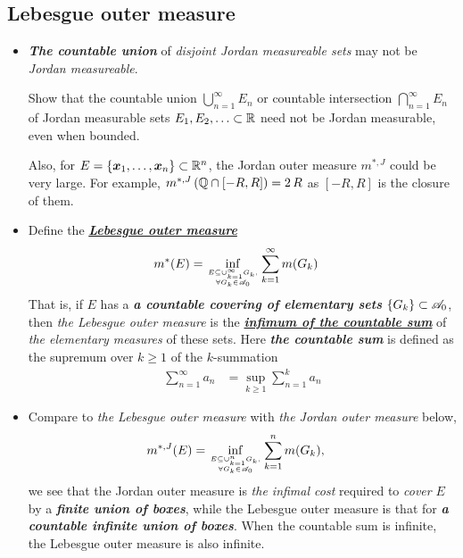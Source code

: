 \documentclass[11pt]{article}
\begin{document}
\subsection{Lebesgue outer measure}
\begin{itemize}
\item \begin{remark} 
\emph{\textbf{The countable union}} of \emph{disjoint Jordan measureable sets} may not be \emph{Jordan measureable}. 

\begin{exercise}
Show that the countable union $\bigcup_{n=1}^{\infty}E_n$ or countable intersection $\bigcap_{n=1}^{\infty}E_n$ of Jordan measurable sets $E_1, E_2, \ldots \subset {\mathbb R}$
need not be Jordan measurable, even when bounded.
\end{exercise}


Also, for $E = \left\{\boldsymbol{x}_{1}, \ldots, \boldsymbol{x}_{n}\right\} \subset {\mathbb R}^{n}$, the Jordan outer measure $m^{*, J}$ could be very large. For example, $m^{*, J}\left({\mathbb Q}\cap [-R, R]\right) = 2\,R$ as $[-R, R]$ is the closure of them. 
\end{remark} 
 
\item \begin{definition}
Define the \underline{\emph{\textbf{Lebesgue outer measure}}} \citep{tao2011introduction}
 \begin{align}
 m^{*}(E) &= \inf\limits_{E \subseteq \cup_{k=1}^{\infty}G_{k}, \atop {\forall G_{k}\in {\mathscr A}_{0}}}\sum_{k=1}^{\infty}m(G_{k})
 \label{eqn: L_outer_measure}
 \end{align} That is, if $E$ has a \emph{\textbf{a countable covering of elementary sets}} $\left\{G_k\right\} \subset {\mathscr A}_{0}$, then \emph{the Lebesgue outer measure} is the \underline{\emph{\textbf{infimum of the countable sum}}} of \emph{the elementary measures} of these sets. Here \emph{\textbf{the countable sum}} is defined as the supremum over $k\ge 1$ of the $k$-summation 
\begin{align*}
\sum_{n=1}^{\infty}a_{n} &= \sup_{k\ge 1}\sum_{n=1}^{k}a_{n}
\end{align*}
\end{definition}
 
\item \begin{remark} 
Compare to \emph{the Lebesgue outer measure} with \emph{the Jordan outer measure} below,
\begin{align*}
m^{*, J}(E) &=  \inf\limits_{E \subseteq \cup_{k=1}^{n}G_{k}, \atop {\forall G_{k}\in {\mathscr A}_{0}}}\sum_{k=1}^{n}m(G_{k}),
\end{align*} we see that the Jordan outer measure is \emph{the infimal cost} required to \emph{cover} $E$ by a \emph{\textbf{finite union of boxes}}, while the Lebesgue outer measure is that for \emph{\textbf{a countable infinite union of boxes}}. When the countable sum is infinite, the Lebesgue outer measure is also infinite. 


\end{remark}
\end{itemize}
\end{document}
